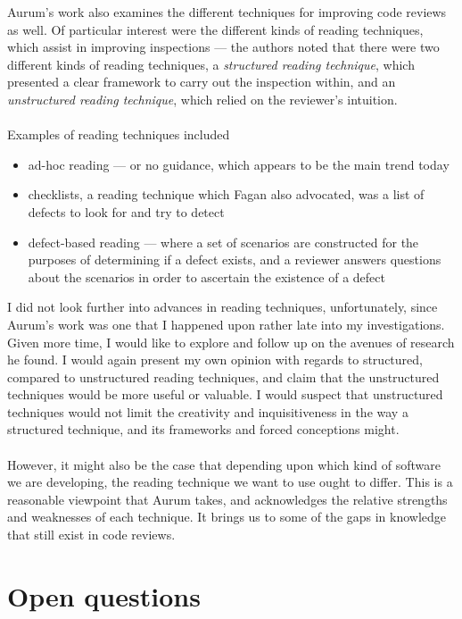 Aurum's work also examines the different techniques for improving code reviews as
well.
Of particular interest were the different kinds of reading techniques, which assist in improving inspections --- the
authors noted that there were two different kinds of reading techniques, a {\em structured
reading technique}, which presented a clear framework to carry out the inspection within, and an
{\em unstructured reading technique}, which relied on the reviewer's intuition.\\
\\
Examples of reading techniques included
\begin{itemize}
	\item ad-hoc reading --- or no guidance, which appears to be the main trend today
	\item checklists, a reading technique which Fagan \cite{AdvancesInSoftwareInspection} also
		advocated, was a list of defects to look for and try to detect
	\item defect-based reading --- where a set of scenarios are constructed for the purposes of
		determining if a defect exists, and a reviewer answers questions about the scenarios in
		order to ascertain the existence of a defect
\end{itemize}

I did not look further into advances in reading techniques, unfortunately, since Aurum's work was
one that I happened upon rather late into my investigations.
Given more time, I would like to explore and follow up on the avenues of research he found.
I would again present my own opinion with regards to structured, compared to unstructured reading
techniques, and claim that the unstructured techniques would be more useful or valuable.
I would suspect that unstructured techniques would not limit the creativity and inquisitiveness in the
way a structured technique, and its frameworks and forced conceptions might.\\
\\
However, it might also be the case that depending upon which kind of software we are developing, the
reading technique we want to use ought to differ.
This is a reasonable viewpoint that Aurum takes, and acknowledges the relative strengths and
weaknesses of each technique.
It brings us to some of the gaps in knowledge that still exist in code reviews.

\section{Open questions}

